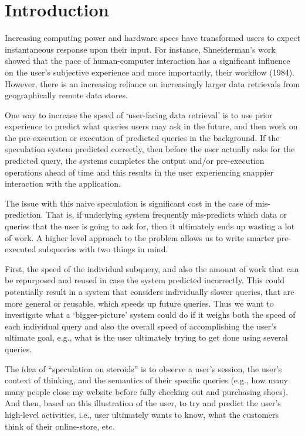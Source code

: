 \section{Introduction}
\label{sec:intro}
Increasing computing power and hardware specs have transformed users to expect
instantaneous response upon their input. For instance, Shneiderman's work showed
that the pace of human-computer interaction has a significant influence on the
user's subjective experience and more importantly, their workflow (1984).
However, there is an increasing reliance on increasingly larger data retrievals
from geographically remote data stores. 

One way to increase the speed of `user-facing data retrieval' is to use prior
experience to predict what queries users may ask in the future, and then work on
the pre-execution or execution of predicted queries in the background. If the
speculation system predicted correctly, then before the user actually asks for
the predicted query, the systems completes the output and/or pre-execution
operations ahead of time and this results in the user experiencing snappier
interaction with the application.

The issue with this naive speculation is significant cost in the case of
mis-prediction. That is, if underlying system frequently mis-predicts which data
or queries that the user is going to ask for, then it ultimately ends up wasting
a lot of work. A higher level approach to the problem allows us to write smarter
pre-executed subqueries with two things in mind. 

First, the speed of the individual subquery, and also the amount of work that
can be repurposed and reused in case the system predicted incorrectly. This
could potentially result in a system that considers individually slower queries,
that are more general or reusable, which speeds up future queries. Thus we want
to investigate what a `bigger-picture' system could do if it weighs both the
speed of each individual query and also the overall speed of accomplishing the
user's ultimate goal, e.g., what is the user ultimately trying to get done using
several queries. 

The idea of ``speculation on steroids'' is to observe a user's session, the
user's context of thinking, and the semantics of their specific queries (e.g.,
how many many people close my website before fully checking out and purchasing
shoes). And then, based on this illustration of the user, to try and predict the
user's high-level activities, i.e., user ultimately wants to know, what the
customers think of their online-store, etc.

